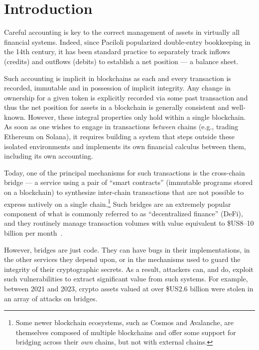 \section{Introduction}

Careful accounting is key to the correct management of assets in
virtually all financial systems.  Indeed, since Paciloli popularized
double-entry bookkeeping in the 14th century, it has been standard
practice to separately track inflows (credits) and outflows (debits)
to establish a net position --- a balance sheet.

Such accounting is implicit in blockchains as each and every
transaction is recorded, immutable and in possession of implicit
integrity.  Any change in ownership for a given token is explicitly
recorded via some past transaction and thus the net position for
assets in a blockchain is generally consistent and
well-known. However, these integral properties only hold within a
single blockchain.  As soon as one wishes to engage in transactions
\emph{between} chains (e.g., trading Ethereum on Solana), it
requires building a system that steps outside these isolated
environments and implements its own financial calculus between them,
including its own accounting.

Today, one of the principal mechanisms for such transactions is the
cross-chain bridge --- a service using a pair of ``smart contracts''
(immutable programs stored on a blockchain) to synthesize inter-chain
transactions that are not possible to express natively on a single
chain.\footnote{Some newer blockchain ecosystems, such as Cosmos and
  Avalanche, are themselves composed of multiple blockchains and offer
  some support for bridging across their \emph{own} chains, but not with external chains.}  Such bridges are an extremely popular component of what is
commonly referred to as ``decentralized finance'' (DeFi), and they
routinely manage transaction volumes with value equivalent to \$US8--10
billion per month~\cite{defillama-volume}.

However, bridges are just code.  They can have bugs in their
implementations, in the other services they depend upon, or in the
mechanisms used to guard the integrity of their cryptographic secrets.
As a result, attackers can, and do, exploit such vulnerabilities to
extract significant value from such systems.  For example, between
2021 and 2023, crypto assets valued at over \$US2.6 billion were
stolen in an array of attacks on bridges. 


